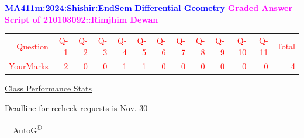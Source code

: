 \documentclass{article}                              %
\begin{document}
%
\vspace*{1in}

\begin{center}
	\textbf{\textcolor{blue}{\LARGE MA411m:2024:Shishir:EndSem}}
	\vskip 1cm
	\textbf{\textcolor{blue}{\underline{\Large Differential Geometry}}}
	\vskip 1cm
	\textbf{\textcolor{magenta}{\LARGE Graded Answer Script of 210103092::Rimjhim Dewan}}
\end{center}


\begin{center}
	\Huge 
	\textcolor{red}{
	\begin{tabular}{*{13}{r}}
		Question&Q-1& Q-2& Q-3& Q-4& Q-5& Q-6& Q-7& Q-8& Q-9& Q-10& Q-11&Total  \\
        	YourMarks&2&0&0&1&1&0&0&0&0&0&0&4
	\end{tabular}
	}
        \vskip 2cm
	\large
	\underline{Class Performance Stats}
	\DTLsetseparator{;}
	\begin{table}[htbp]
		\centering
	\end{table}
	\vskip 1cm
	Deadline for recheck requests is Nov. 30
\end{center}
\ \vfill \ \hfill \small AutoG\textsuperscript{\copyright}
\newpage
%
\end{document}
